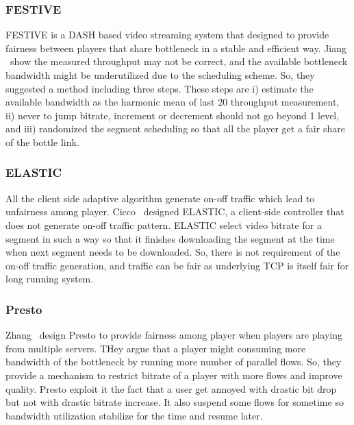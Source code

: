 \subsubsection{FESTIVE}
FESTIVE\cite{10.1145/2413176.2413189} is a DASH based video streaming system that designed to provide fairness between players that share bottleneck in a stable and efficient way. Jiang \etal\ show the measured throughput may not be correct, and the available bottleneck bandwidth might be underutilized due to the scheduling scheme. So, they suggested a method including three steps. These steps are i) estimate the available bandwidth as the harmonic mean of last 20 throughput measurement, ii) never to jump bitrate, increment or decrement should not go beyond 1 level, and iii) randomized the segment scheduling so that all the player get a fair share of the bottle link.

\subsubsection{ELASTIC\cite{6691442}}
All the client side adaptive algorithm generate on-off traffic which lead to unfairness among player. Cicco \etal\ designed ELASTIC\cite{6691442}, a client-side controller that does not generate on-off traffic pattern. ELASTIC select video bitrate for a segment in such a way so that it finishes downloading the segment at the time when next segment needs to be downloaded. So, there is not requirement of the on-off traffic generation, and traffic can be fair as underlying TCP is itself fair for long running system.

\subsubsection{Presto\cite{7249417}}
Zhang \etal\ design Presto\cite{7249417} to provide fairness among player when players are playing from multiple servers. THey argue that a player might consuming more bandwidth of the bottleneck by running more number of parallel flows. So, they provide a mechanism to restrict bitrate of a player with more flows and improve quality. Presto exploit it the fact that a user get annoyed with drastic bit drop but not with drastic bitrate increase\cite{10.1145/2018602.2018611}. It also suspend some flows for sometime so bandwidth utilization stabilize for the time and resume later.


